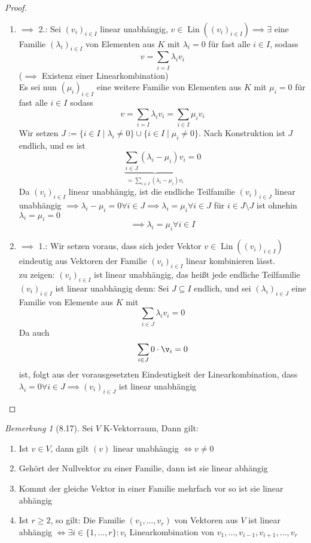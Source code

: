 \documentclass[a4paper]{scrartcl}
\DeclareMathOperator{\Exists}{\exists}
\DeclareMathOperator{\Forall}{\forall}
\DeclareMathOperator{\Lin}{Lin}
\theoremstyle{definition}
\theoremstyle{plain}
\theoremstyle{plain}
\theoremstyle{remark}
\newtheorem{remark}{Bemerkung}
\theoremstyle{remark}
\theoremstyle{remark}
\theoremstyle{remark}
\theoremstyle{remark}
\begin{document}
\begin{proof}
\begin{enumerate}
\item $\implies$ 2.: Sei $(v_i)_{i\in I}$ linear unabhängig, $v\in \Lin((v_i)_{i\in I}) \implies \Exists$ eine Familie $(\lambda_i)_{i\in I}$ von Elementen aus $K$ mit
$\lambda_i = 0$ für fast alle $i\in I$, sodass
\[v = \sum_{i=I} \lambda_i v_i\]
($\implies$ Existenz einer Linearkombination) \\
         Es sei nun $(\mu_i)_{i\in I}$ eine weitere Familie von Elementen aus $K$ mit $\mu_i = 0$ für fast alle $i \in I$ sodass
\[v = \sum_{i = I} \lambda_i v_i = \sum_{i\in I} \mu_i v_i\]
Wir setzen $J:= \{i\in I \mid \lambda_i \neq 0\} \cup \{i \in I \mid \mu_i \neq 0\}$. Nach Konstruktion ist $J$ endlich, und es ist
\[\underbrace{\sum_{i\in J} (\lambda_i - \mu_i) v_i}_{=\sum_{i\in I} (\lambda_i - \mu_i) v_i} = 0\]
Da $(v_i)_{i\in I}$ linear unabhängig, ist die endliche Teilfamilie $(v_i)_{i\in J}$ linear unabhängig $\implies \lambda_i - \mu_i = 0 \Forall i\in J \implies \lambda_i = \mu_i \Forall i\in J$
für $i\in J\setminus J$ ist ohnehin $\lambda_i = \mu_i = 0$
\[\implies \lambda_i = \mu_i \Forall i\in I\]
\item $\implies$ 1.: Wir setzen voraus, dass sich jeder Vektor $v\in\Lin((v_i)_{i\in I})$ eindeutig aus Vektoren der Familie $(v_i)_{i\in I}$ linear kombinieren lässt. \\
         zu zeigen: $(v_i)_{i\in I}$ ist linear unabhängig, das heißt jede endliche Teilfamilie $(v_i)_{i\in I}$ ist linear unabhängig denn:
Sei $J \subseteq I$ endlich, und sei $(\lambda_i)_{i\in J}$ eine Familie von Elemente aus $K$ mit
\[\sum_{i\in J}\lambda_i v_i = 0\]
Da auch
\[\sum_{i\in J} 0 \cdot \v_i = 0\]
ist, folgt aus der vorausgesetzten Eindeutigkeit der Linearkombination, dass $\lambda_i = 0 \Forall i\in J \implies (v_i)_{i\in J}$ ist linear unabhängig
\end{enumerate}
\end{proof}
\begin{remark}[8.17]
Sei $V$ K-Vektorraum, Dann gilt:
\begin{enumerate}
\item Ist $v\in V$, dann gilt $(v)$ linear unabhängig $\iff v \neq 0$
\item Gehört der Nullvektor zu einer Familie, dann ist sie linear abhängig
\item Kommt der gleiche Vektor in einer Familie mehrfach vor so ist sie linear abhängig
\item Ist $r\geq 2$, so gilt: Die Familie $(v_1, \ldots, v_r)$ von Vektoren aus $V$ ist linear abhängig $\iff \Exists i \in \{1, \ldots, r\}: v_i$ Linearkombination von $v_1, \ldots, v_{i - 1}, v_{i + 1}, \ldots, v_r$
\end{enumerate}
\end{remark}
\end{document}
